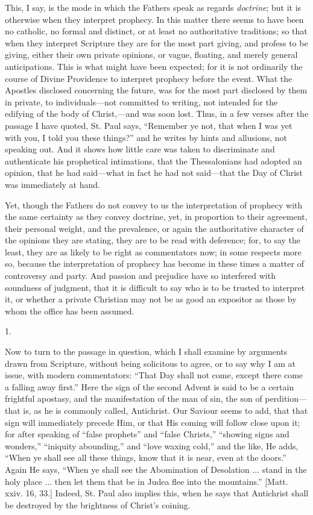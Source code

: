 This, I say, is the mode in which the Fathers speak as regards \emph{doctrine};
but it is otherwise when they interpret prophecy. In this matter there
seems to have been no catholic, no formal and distinct, or at least no
authoritative traditions; so that when they interpret Scripture they
are for the most part giving, and profess to be giving, either their
own private opinions, or vague, floating, and merely general
anticipations. This is what might have been expected; for it is not
ordinarily the course of Divine Providence to interpret prophecy
before the event. What the Apostles disclosed concerning the future,
was for the most part disclosed by them in private, to individuals—not
committed to writing, not intended for the edifying of the body of
Christ,—and was soon lost. Thus, in a few verses after the passage I
have quoted, St. Paul says, ``Remember ye not, that when I was yet
with you, I told you these things?'' and he writes by hints and
allusions, not speaking out. And it shows how little care was taken to
discriminate and authenticate his prophetical intimations, that the
Thessalonians had adopted an opinion, that he had said—what in
fact he had not said—that the Day of Christ was immediately at hand.

Yet, though the Fathers do not convey to us the interpretation of
prophecy with the same certainty as they convey doctrine, yet, in
proportion to their agreement, their personal weight, and the
prevalence, or again the authoritative character of the opinions they
are stating, they are to be read with deference; for, to say the
least, they are as likely to be right as commentators now; in some
respects more so, because the interpretation of prophecy has become in
these times a matter of controversy and party. And passion and
prejudice have so interfered with soundness of judgment, that it is
difficult to say who is to be trusted to interpret it, or whether a
private Christian may not be as good an expositor as those by whom the
office has been assumed.

1.

Now to turn to the passage in question, which I shall examine by
arguments drawn from Scripture, without being solicitous to agree, or
to say why I am at issue, with modern commentators: ``That Day
shall not come, except there come a falling away first.'' Here the
sign of the second Advent is said to be a certain frightful apostasy,
and the manifestation of the man of sin, the son of perdition—that
is, as he is commonly called, Antichrist. Our Saviour seems to add,
that that sign will immediately precede Him, or that His coming will
follow close upon it; for after speaking of ``false prophets''
and ``false Christs,'' ``showing signs and wonders,''
``iniquity abounding,'' and ``love waxing cold,'' and
the like, He adds, ``When ye shall see all these things, know that
it is near, even at the doors.'' Again He says, ``When ye
shall see the Abomination of Desolation ... stand in the holy place
... then let them that be in Judea flee into the mountains.''
[Matt. xxiv. 16, 33.] Indeed, St. Paul also implies this, when he says
that Antichrist shall be destroyed by the brightness of Christ's
coining.

